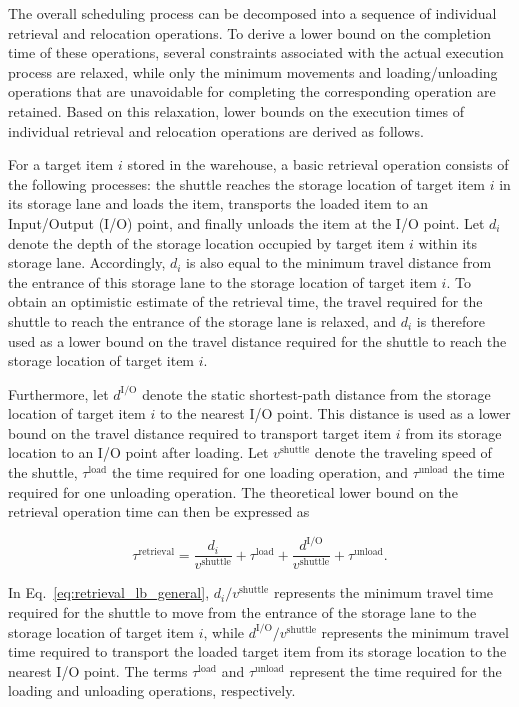 The overall scheduling process can be decomposed into a sequence of individual retrieval and relocation operations. To derive a lower bound on the completion time of these operations, several constraints associated with the actual execution process are relaxed, while only the minimum movements and loading/unloading operations that are unavoidable for completing the corresponding operation are retained. Based on this relaxation, lower bounds on the execution times of individual retrieval and relocation operations are derived as follows.

For a target item \(i\) stored in the warehouse, a basic retrieval operation consists of the following processes: the shuttle reaches the storage location of target item \(i\) in its storage lane and loads the item, transports the loaded item to an Input/Output (I/O) point, and finally unloads the item at the I/O point. Let \(d_i\) denote the depth of the storage location occupied by target item \(i\) within its storage lane. Accordingly, \(d_i\) is also equal to the minimum travel distance from the entrance of this storage lane to the storage location of target item \(i\). To obtain an optimistic estimate of the retrieval time, the travel required for the shuttle to reach the entrance of the storage lane is relaxed, and \(d_i\) is therefore used as a lower bound on the travel distance required for the shuttle to reach the storage location of target item \(i\).

Furthermore, let \(d^{\mathrm{I/O}}\) denote the static shortest-path distance from the storage location of target item \(i\) to the nearest I/O point. This distance is used as a lower bound on the travel distance required to transport target item \(i\) from its storage location to an I/O point after loading. Let \(v^{\mathrm{shuttle}}\) denote the traveling speed of the shuttle, \(\tau^{\mathrm{load}}\) the time required for one loading operation, and \(\tau^{\mathrm{unload}}\) the time required for one unloading operation. The theoretical lower bound on the retrieval operation time can then be expressed as

\begin{equation}
\tau^{\mathrm{retrieval}}
=
\frac{d_i}{v^{\mathrm{shuttle}}}
+
\tau^{\mathrm{load}}
+
\frac{d^{\mathrm{I/O}}}{v^{\mathrm{shuttle}}}
+
\tau^{\mathrm{unload}}.
\label{eq:retrieval_lb_general}
\end{equation}

In Eq.~\eqref{eq:retrieval_lb_general}, \(d_i/v^{\mathrm{shuttle}}\) represents the minimum travel time required for the shuttle to move from the entrance of the storage lane to the storage location of target item \(i\), while \(d^{\mathrm{I/O}}/v^{\mathrm{shuttle}}\) represents the minimum travel time required to transport the loaded target item from its storage location to the nearest I/O point. The terms \(\tau^{\mathrm{load}}\) and \(\tau^{\mathrm{unload}}\) represent the time required for the loading and unloading operations, respectively.

